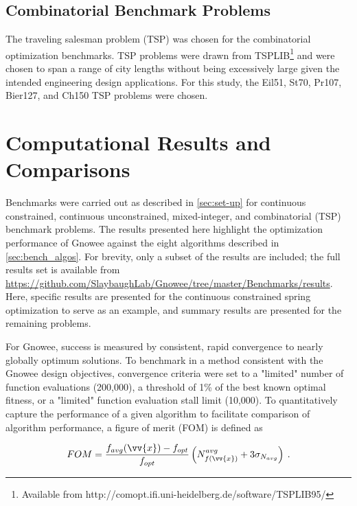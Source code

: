 \documentclass{article}                                                                           %
\begin{document}
\subsection{Combinatorial Benchmark Problems} \label{sec:comb_bench}
The traveling salesman problem (TSP) was chosen for the combinatorial optimization benchmarks. 
TSP problems were drawn from TSPLIB\footnote{Available from http://comopt.ifi.uni-heidelberg.de/software/TSPLIB95/} and were chosen to span a range of city lengths without being excessively large given the intended engineering design applications.  
For this study, the Eil51, St70, Pr107, Bier127, and Ch150 TSP problems were chosen. 


\section{Computational Results and Comparisons} \label{sec:results}
Benchmarks were carried out as described in \autoref{sec:set-up} for continuous constrained, continuous unconstrained, mixed-integer, and combinatorial (TSP) benchmark problems.  
The results presented here highlight the optimization performance of Gnowee against the eight algorithms described in \autoref{sec:bench_algos}.  
For brevity, only a subset of the results are included; the full results set is available from \url{https://github.com/SlaybaughLab/Gnowee/tree/master/Benchmarks/results}. 
Here, specific results are presented for the continuous constrained spring optimization to serve as an example, and summary results are presented for the remaining problems.  

For Gnowee, success is measured by consistent, rapid convergence to nearly globally optimum solutions.  
To benchmark in a method consistent with the Gnowee design objectives, convergence criteria were set to a "limited" number of function evaluations (200,000), a threshold of 1\% of the best known optimal fitness, or a "limited" function evaluation stall limit (10,000).   
To quantitatively capture the performance of a given algorithm to facilitate comparison of algorithm performance, a figure of merit (FOM) is defined as

\begin{equation} \label{eq:fom}
  FOM = \frac{f_{avg}(\vv{x})-f_{opt}}{f_{opt}} \left(N^{avg}_{f(\vv{x})} + 3 \sigma_{N_{avg}} \right)\:.
\end{equation}
\end{document}
